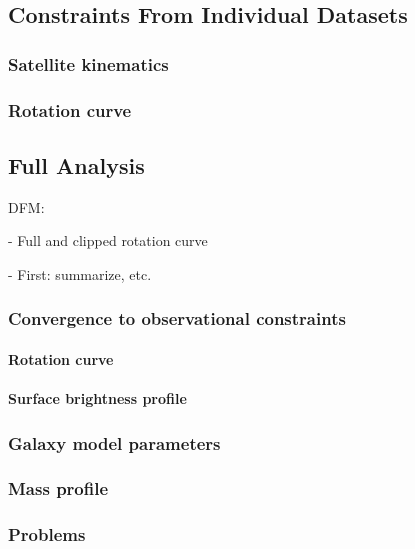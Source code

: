 \documentclass[preprint]{aastex}
\begin{document}
\subsection{Constraints From Individual Datasets}

\subsubsection{Satellite kinematics}

\subsubsection{Rotation curve}

\subsection{Full Analysis}

DFM:

- Full and clipped rotation curve

- First: summarize, etc.

\subsubsection{Convergence to observational constraints}

\paragraph{Rotation curve}

\paragraph{Surface brightness profile}



\subsubsection{Galaxy model parameters}

\subsubsection{Mass profile}

\subsubsection{Problems}
\end{document}
